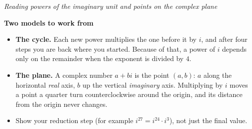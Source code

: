 \documentclass[12pt]{article}
\begin{document}

\begin{center}
{\small\textit{Reading powers of the imaginary unit and points on the complex plane}}
\end{center}

\vspace{0.15cm}
\noindent\textbf{Two models to work from}
\begin{itemize}[leftmargin=0.7cm, itemsep=2pt, topsep=3pt]
  \item \textbf{The cycle.} Each new power multiplies the one before it by $i$,
    and after four steps you are back where you started. Because of that, a power
    of $i$ depends only on the remainder when the exponent is divided by $4$.
  \item \textbf{The plane.} A complex number $a + bi$ is the point $(a, b)$:
    $a$ along the horizontal \emph{real} axis, $b$ up the vertical
    \emph{imaginary} axis. Multiplying by $i$ moves a point a quarter turn
    counterclockwise around the origin, and its distance from the origin never
    changes.
  \item Show your reduction step (for example $i^{27} = i^{24} \cdot i^{3}$),
    not just the final value.
\end{itemize}

\vspace{0.2cm}

\end{document}
